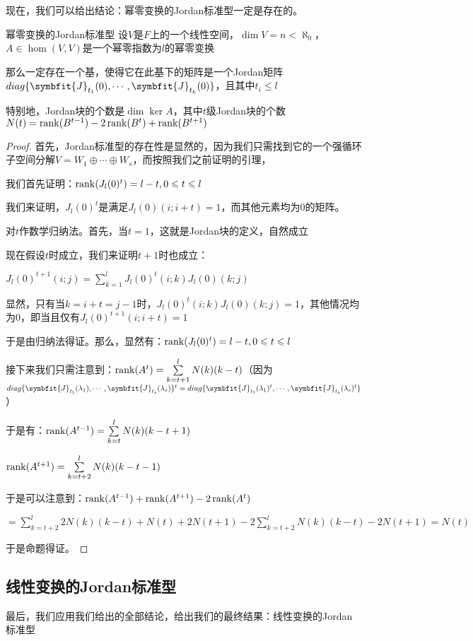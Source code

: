 \documentclass[12pt, a4paper, oneside, UTF8]{ctexbook}
\begin{document}
			现在，我们可以给出结论：幂零变换的Jordan标准型一定是存在的。
			\begin{them}{幂零变换的Jordan标准型}{}
				设$V$是$F$上的一个线性空间，$\dim V = n < \aleph_0$，$A \in \hom(V,V)$是一个幂零指数为$l$的幂零变换

				那么一定存在一个基，使得它在此基下的矩阵是一个Jordan矩阵$diag\{\symbfit{J}_{t_1}(0),\cdots,\symbfit{J}_{t_k}(0)\}$，且其中$t_i \leqslant l$

				特别地，Jordan块的个数是$\dim \ker A$，其中$t$级Jordan块的个数$N(t)=\operatorname{rank}(B^{t-1})-2\operatorname{rank}(B^t)+\operatorname{rank}(B^{t+1})$
			\end{them}
			\begin{proof}
				首先，Jordan标准型的存在性是显然的，因为我们只需找到它的一个强循环子空间分解$V=W_1 \oplus \cdots \oplus W_s$，而按照我们之前证明的引理，

				我们首先证明：$\operatorname{rank}(J_l(0)^{t})=l-t,0 \leqslant t \leqslant l$

				我们来证明，$J_l(0)^t$是满足$J_l(0)(i;i+t)=1$，而其他元素均为$0$的矩阵。

				对$t$作数学归纳法。首先，当$t=1$，这就是Jordan块的定义，自然成立

				现在假设$t$时成立，我们来证明$t+1$时也成立：

				$J_{l}(0)^{t+1}(i;j)=\sum\limits_{k=1}^{l}J_l(0)^t(i;k)J_l(0)(k;j)$

				显然，只有当$k=i+t=j-1$时，$J_l(0)^t(i;k)J_l(0)(k;j)=1$，其他情况均为$0$，即当且仅有$J_{l}(0)^{t+1}(i;i+t)=1$

				于是由归纳法得证。那么，显然有：$\operatorname{rank}(J_l(0)^t)=l-t,0 \leqslant t \leqslant l$

				接下来我们只需注意到：$\operatorname{rank}(A^t)=\sum\limits_{k=t+1}^{l} N(k)(k-t)$（因为$diag\{\symbfit{J}_{t_1}(\lambda_1),\cdots,\symbfit{J}_{t_s}(\lambda_s)\}^{t}=diag\{\symbfit{J}_{t_1}(\lambda_1)^t,\cdots,\symbfit{J}_{t_s}(\lambda_s)^t\}$）

				于是有：$\operatorname{rank}(A^{t-1})=\sum\limits_{k=t}^{l} N(k)(k-t+1)$

				$\operatorname{rank}(A^{t+1})=\sum\limits_{k=t+2}^{l} N(k)(k-t-1)$

				于是可以注意到：$\operatorname{rank}(A^{t-1})+\operatorname{rank}(A^{t+1})-2\operatorname{rank}(A^t)$

				$=\sum\limits_{k=t+2}^{l} 2N(k)(k-t)+N(t)+2N(t+1)-2\sum\limits_{k=t+2}^{l}N(k)(k-t)-2N(t+1)=N(t)$

				于是命题得证。
			\end{proof}
		\subsection{线性变换的Jordan标准型}
			最后，我们应用我们给出的全部结论，给出我们的最终结果：线性变换的Jordan标准型
\end{document}
